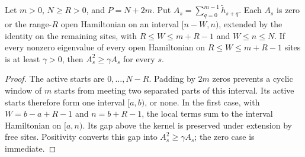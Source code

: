 \begin{lemma}
    \label{thm:open_knabe_clipped_windows}
    \leanok
    Let $m>0$, $N\geq R>0$, and $P=N+2m$. Put
    $A_s=\sum_{q=0}^{m-1}\widetilde h_{s+q}$. Each $A_s$ is zero or the
    range-$R$ open Hamiltonian on an interval $[n-W,n)$, extended by the
    identity on the remaining sites, with
    $R\leq W\leq m+R-1$ and $W\leq n\leq N$.
    If every nonzero eigenvalue of every open Hamiltonian on
    $R\leq W\leq m+R-1$ sites is at least $\gamma>0$, then
    $A_s^2\geq\gamma A_s$ for every $s$.
\end{lemma}
\begin{proof}\leanok
    The active starts are $0,\ldots,N-R$. Padding by $2m$ zeros prevents
    a cyclic window of $m$ starts from meeting two separated parts of this
    interval. Its active starts therefore form one interval $[a,b)$, or
    none. In the first case, with $W=b-a+R-1$ and $n=b+R-1$, the local terms
    sum to the interval Hamiltonian on $[a,n)$.
    Its gap above the kernel is preserved under extension by free sites. Positivity
    converts this gap into $A_s^2\geq\gamma A_s$; the zero case is immediate.
\end{proof}

